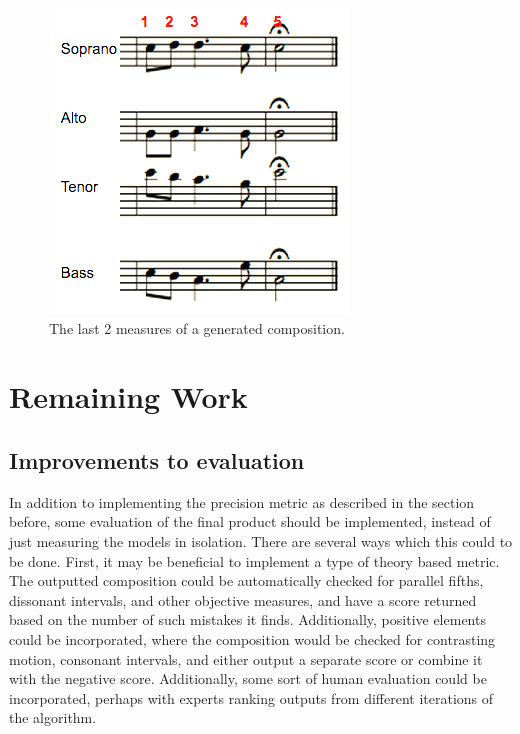 \documentclass{sig-alternate}
\begin{document}
\begin{figure}
  \includegraphics[scale=0.8]{measures}
  \caption{The last 2 measures of a generated composition.}
\end{figure}



\section{Remaining Work}
\subsection{Improvements to evaluation}
In addition to implementing the precision metric as described in the section before, some evaluation of the final product should be implemented, instead of just measuring the models in isolation. There are several ways which this could to be done. First, it may be beneficial to implement a type of theory based metric. The outputted composition could be automatically checked for parallel fifths, dissonant intervals, and other objective measures, and have a score returned based on the number of such mistakes it finds. Additionally, positive elements could be incorporated, where the composition would be checked for contrasting motion, consonant intervals, and either output a separate score or combine it with the negative score. Additionally, some sort of human evaluation could be incorporated, perhaps with experts ranking outputs from different iterations of the algorithm.
\end{document}
